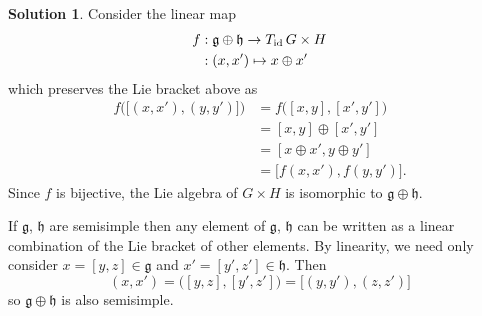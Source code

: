 \documentclass[11pt, a4paper]{report}
\theoremstyle{definition}
\newtheorem{solution}{Solution}[part]
\newenvironment{sol}{\begin{solution}}{\end{solution}\pagebreak[3]}
\newcommand*{\id}{\ensuremath\mathop{}\mathopen{}\mathrm{id}}
\begin{document}
\begin{sol}
Consider the linear map
\begin{align*}
    f &: \mathfrak{g} \oplus \mathfrak{h} \to T_{\id}\, G \times H \\
      &: (x, x') \mapsto x \oplus x'
\end{align*}
which preserves the Lie bracket above as
\begin{align*}
    f \bigl( \bigl[(x, x'), (y, y') \bigr] \bigr)
        &= f \bigl( [x, y], [x'\!, y'] \bigr) \\
        &= [x, y] \oplus [x'\!, y'] \\
        &= [x \oplus x', y \oplus y'] \\
        &= \bigl[ f(x, x'), f(y, y') \bigr].
\end{align*}
Since $f$ is bijective, the Lie algebra of $G \times H$ is isomorphic to $\mathfrak{g} \oplus \mathfrak{h}$.

If $\mathfrak{g}$, $\mathfrak{h}$ are semisimple then any element of $\mathfrak{g}$, $\mathfrak{h}$ can be written as a linear combination of the Lie bracket of other elements.
By linearity, we need only consider $x = [y, z] \in \mathfrak{g}$ and $x' = [y', z'] \in \mathfrak{h}$.
Then
\[
    (x, x') = \bigl( [y, z], [y', z'] )
            = \bigl[ (y, y'), (z, z') \bigr]
\]
so $\mathfrak{g} \oplus \mathfrak{h}$ is also semisimple.

\end{sol}
\end{document}
